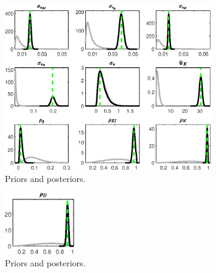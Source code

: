  
\begin{figure}[H]
\centering
\includegraphics[width=0.80\textwidth]{BRS_growth_ext_comovement/Output/BRS_growth_ext_comovement_PriorsAndPosteriors1}
\caption{Priors and posteriors.}\label{Fig:PriorsAndPosteriors:1}
\end{figure}
 
\begin{figure}[H]
\centering
\includegraphics[width=0.27\textwidth]{BRS_growth_ext_comovement/Output/BRS_growth_ext_comovement_PriorsAndPosteriors2}
\caption{Priors and posteriors.}\label{Fig:PriorsAndPosteriors:2}
\end{figure}
 
